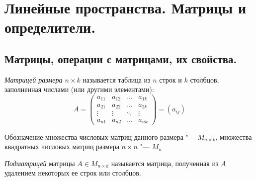\section{Линейные пространства. Матрицы и определители.}

\subsection{Матрицы, операции с матрицами, их свойства.}

    \begin{definition}
    	\textit{Матрицей размера $n \times k$} называется таблица из $n$ строк и $k$ столбцов, заполненная числами (или другими элементами):
    	\[A = 
    	\begin{pmatrix}
    	a_{11} & a_{12} & \dots & a_{1k} \\
    	a_{21} & a_{22} & \dots & a_{2k} \\
    	\vdots & \vdots & \ddots & \vdots \\
    	a_{n1} & a_{n2} & \dots & a_{nk}
    	\end{pmatrix}
    	= (a_{ij})\]
    	
    	Обозначение множества числовых матриц данного размера "--- $M_{n \times k}$, множества квадратных числовых матриц размера $n \times n$ "--- $M_{n}$
    \end{definition}
    
    \begin{definition}
    	\textit{Подматрицей} матрицы $A \in M_{n \times k}$ называется матрица, полученная из $A$ удалением некоторых ее строк или столбцов.
    \end{definition}
    
